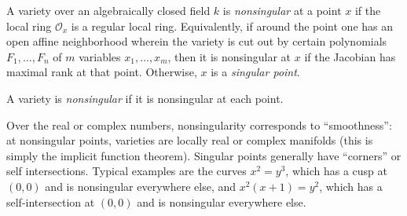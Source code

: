 \documentclass[12pt]{article}
\begin{document}
A variety over an algebraically closed field $k$
is \emph{nonsingular} at a point $x$
if the local ring $\mathcal{O}_x$ is a regular local ring.
Equivalently, if around the point one has an open affine neighborhood
wherein the variety is cut out
by certain polynomials $F_1, \ldots, F_n$ of $m$ variables $x_1, \ldots, x_m$,
then it is nonsingular at $x$ if the Jacobian has maximal rank at that point.
Otherwise, $x$ is a \emph{singular point}.

A variety is \emph{nonsingular} if it is nonsingular at each point.

Over the real or complex numbers, nonsingularity corresponds to ``smoothness'':
at nonsingular points, varieties are locally real or complex manifolds
(this is simply the implicit function theorem).
Singular points generally have ``corners'' or self intersections.
Typical examples are the curves $x^2=y^3$,
which has a cusp at $(0,0)$ and is nonsingular everywhere else,
and $x^2(x+1)=y^2$,
which has a self-intersection at $(0,0)$ and is nonsingular everywhere else.
\end{document}

